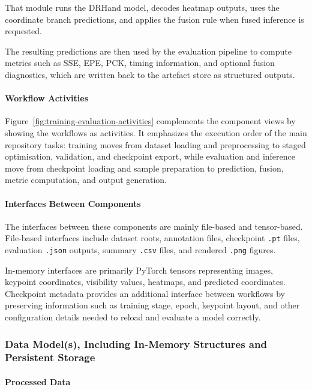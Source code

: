 ﻿\documentclass[11pt,a4paper]{article}
\begin{document}
\noindent
That module runs the DRHand model, decodes heatmap outputs, uses the
coordinate branch predictions, and applies the fusion rule when fused
inference is requested.

\medskip

\noindent
The resulting predictions are then used by the evaluation pipeline to compute
metrics such as SSE, EPE, PCK, timing information, and optional fusion
diagnostics, which are written back to the artefact store as structured
outputs.

\paragraph*{Workflow Activities}

Figure~\ref{fig:training-evaluation-activities} complements the component
views by showing the workflows as activities. It emphasizes the execution
order of the main repository tasks: training moves from dataset loading and
preprocessing to staged optimisation, validation, and checkpoint export,
while evaluation and inference move from checkpoint loading and sample
preparation to prediction, fusion, metric computation, and output generation.

\paragraph*{Interfaces Between Components}

The interfaces between these components are mainly file-based and
tensor-based. File-based interfaces include dataset roots, annotation files,
checkpoint \texttt{.pt} files, evaluation \texttt{.json} outputs, summary
\texttt{.csv} files, and rendered \texttt{.png} figures.

\medskip

\noindent
In-memory interfaces are primarily PyTorch tensors representing images,
keypoint coordinates, visibility values, heatmaps, and predicted coordinates.
Checkpoint metadata provides an additional interface between workflows by
preserving information such as training stage, epoch, keypoint layout, and
other configuration details needed to reload and evaluate a model correctly.

\subsubsection{Data Model(s), Including In-Memory Structures and Persistent Storage}

\paragraph*{Processed Data}
\end{document}
